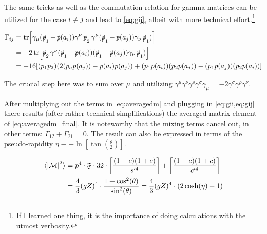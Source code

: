 The same tricks as well as the commutation relation for gamma matrices
can be utilized for the case \(i\neq j\) and lead to \cref{eq:gij},
albeit with more technical effort.\footnote{If I learned one thing, it
  is the importance of doing calculations with the utmost verbosity.}

\begin{equation}
  \label{eq:gij}
  \begin{split}
\Gamma_{ij} &=
\tr[\gamma_\mu(\operatorname{\slashed{p}}_1-\operatorname{\slashed{p}}(a_i))\gamma^\nu\operatorname{\slashed{p}}_2\gamma^\mu(\operatorname{\slashed{p}}_1-\operatorname{\slashed{p}}(a_j))\gamma_\nu\operatorname{\slashed{p}}_1)]\\
&= -2\tr[\operatorname{\slashed{p}}_2\gamma^\nu(\operatorname{\slashed{p}}_1-\operatorname{\slashed{p}}(a_i))(\operatorname{\slashed{p}}_1-\operatorname{\slashed{p}}(a_j))\gamma_\nu\operatorname{\slashed{p}}_1)]
   \\
&=-16\qty[(p_1p_2)(2(p_ap(a_j)) - p(a_i)p(a_j)) +
(p_1p(a_i))(p_2p(a_j)) - (p_1p(a_j))(p_2p(a_i))]
\end{split}
\end{equation}

The crucial step here was to sum over \(\mu\) and utilizing
\(\gamma ^{\mu }\gamma ^{\nu }\gamma ^{\rho }\gamma ^{\sigma }\gamma
_{\mu }=-2\gamma ^{\sigma }\gamma ^{\rho }\gamma ^{\nu }\).


After multiplying out the terms in \cref{eq:averagedm} and plugging in
\cref{eq:gii,eq:gij} there results (after rather technical
simplifications) the averaged matrix element of
\cref{eq:averagedm_final}. It is noteworthy that the mixing terms
cancel out, in other terms: \(\Gamma_{12} + \Gamma_{21} = 0\). The
result can also be expressed in terms of the pseudo-rapidity
\(\eta \equiv -\ln[\tan(\frac{\theta}{2})]\).

\begin{equation}
  \label{eq:averagedm_final}
  \begin{split}
  \langle\abs{\mathcal{M}}^2\rangle &= p^4\cdot\mathfrak{F}\cdot
  32\cdot\qty[\frac{(1-c)(1+c)}{s'^4}] + \qty[\frac{(1-c)(1+c)}{c'^4}] \\
  &= \frac{4}{3}(gZ)^4 \cdot\frac{1+\cos^2(\theta)}{\sin^2(\theta)} =
  \frac{4}{3}(gZ)^4\cdot(2\cosh(\eta) - 1)
  \end{split}
\end{equation}

